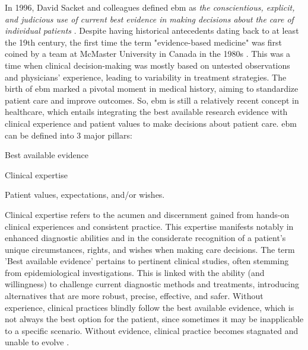 
In 1996, David Sacket and colleagues defined \ac{ebm} as \textit{the conscientious, explicit, and judicious use of current best evidence in making decisions about the care of individual patients} \cite{sackettEvidenceBasedMedicine1996}. Despite having historical antecedents dating back to at least the 19th century, the first time the term "evidence-based medicine" was first coined by a team at McMaster University in Canada in the 1980s \cite{thomaBriefHistoryEvidenceBased2015}. This was a time when clinical decision-making was mostly based on untested observations and physicians' experience, leading to variability in treatment strategies. The birth of \ac{ebm} marked a pivotal moment in medical history, aiming to standardize patient care and improve outcomes. So, \ac{ebm} is still a relatively recent concept in healthcare, which entails integrating the best available research evidence with clinical experience and patient values to make decisions about patient care. 
\Ac{ebm} can be defined into 3 major pillars:
\begin{myitemize}
    \item Best available evidence
    \item Clinical expertise
    \item Patient values, expectations, and/or wishes.
\end{myitemize}

Clinical expertise refers to the acumen and discernment gained from hands-on clinical experiences and consistent practice. This expertise manifests notably in enhanced diagnostic abilities and in the considerate recognition of a patient's unique circumstances, rights, and wishes when making care decisions. The term 'Best available evidence' pertains to pertinent clinical studies, often stemming from epidemiological investigations. This is linked with the ability (and willingness) to challenge current diagnostic methods and treatments, introducing alternatives that are more robust, precise, effective, and safer. 
Without experience, clinical practices blindly follow the best available evidence, which is not always the best option for the patient, since sometimes it may be inapplicable to a specific scenario. Without evidence, clinical practice becomes stagnated and unable to evolve \cite{sackettEvidenceBasedMedicine1996}.


